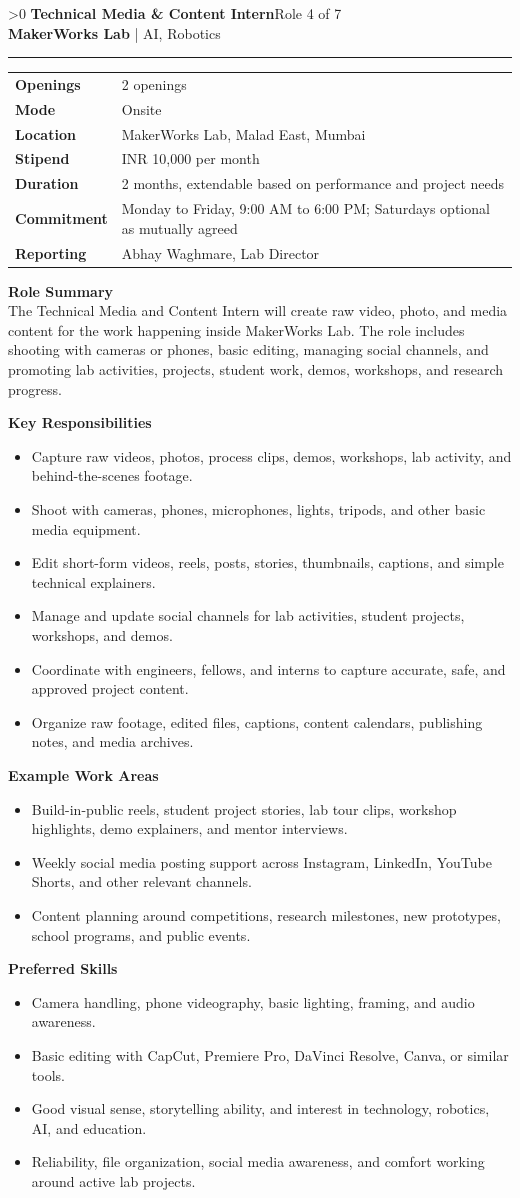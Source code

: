 \documentclass[10pt,a4paper]{article}
\newcommand{\CommonLocation}{MakerWorks Lab, Malad East, Mumbai}
\newcommand{\CommonStipend}{INR 10,000 per month}
\newcommand{\CommonDuration}{2 months, extendable based on performance and project needs}
\newcommand{\CommonCommitment}{Monday to Friday, 9:00 AM to 6:00 PM; Saturdays optional as mutually agreed}
\newcommand{\CommonReporting}{Abhay Waghmare, Lab Director}
\newcounter{rolepage}
\newcommand{\RolePage}[3]{%
  \ifnum\value{rolepage}>0\clearpage\fi
  \stepcounter{rolepage}
  \thispagestyle{plain}
  {\Large\textbf{#1}}\hfill{\small #2}\\
  {\small\textbf{MakerWorks Lab} | AI, Robotics}\\[4pt]
  \hrule
  \vspace{6pt}
  #3
}
\newcommand{\DetailsTable}[3]{%
\begin{tabularx}{\linewidth}{>{\bfseries}p{30mm}X}
Openings & #3 \\
Mode & #1 \\
Location & #2 \\
Stipend & \CommonStipend \\
Duration & \CommonDuration \\
Commitment & \CommonCommitment \\
Reporting & \CommonReporting \\
\end{tabularx}
}
\newcommand{\RoleSection}[1]{\vspace{5pt}\par\noindent\textbf{#1}\par\vspace{2pt}}
\begin{document}
\RolePage{Technical Media \& Content Intern}{Role 4 of 7}{
\DetailsTable{Onsite}{\CommonLocation}{2 openings}

\textbf{Role Summary}\\
The Technical Media and Content Intern will create raw video, photo, and media content for the work happening inside MakerWorks Lab. The role includes shooting with cameras or phones, basic editing, managing social channels, and promoting lab activities, projects, student work, demos, workshops, and research progress.

\RoleSection{Key Responsibilities}
\begin{itemize}
  \item Capture raw videos, photos, process clips, demos, workshops, lab activity, and behind-the-scenes footage.
  \item Shoot with cameras, phones, microphones, lights, tripods, and other basic media equipment.
  \item Edit short-form videos, reels, posts, stories, thumbnails, captions, and simple technical explainers.
  \item Manage and update social channels for lab activities, student projects, workshops, and demos.
  \item Coordinate with engineers, fellows, and interns to capture accurate, safe, and approved project content.
  \item Organize raw footage, edited files, captions, content calendars, publishing notes, and media archives.
\end{itemize}

\RoleSection{Example Work Areas}
\begin{itemize}
  \item Build-in-public reels, student project stories, lab tour clips, workshop highlights, demo explainers, and mentor interviews.
  \item Weekly social media posting support across Instagram, LinkedIn, YouTube Shorts, and other relevant channels.
  \item Content planning around competitions, research milestones, new prototypes, school programs, and public events.
\end{itemize}

\RoleSection{Preferred Skills}
\begin{itemize}
  \item Camera handling, phone videography, basic lighting, framing, and audio awareness.
  \item Basic editing with CapCut, Premiere Pro, DaVinci Resolve, Canva, or similar tools.
  \item Good visual sense, storytelling ability, and interest in technology, robotics, AI, and education.
  \item Reliability, file organization, social media awareness, and comfort working around active lab projects.
\end{itemize}

}
\end{document}
